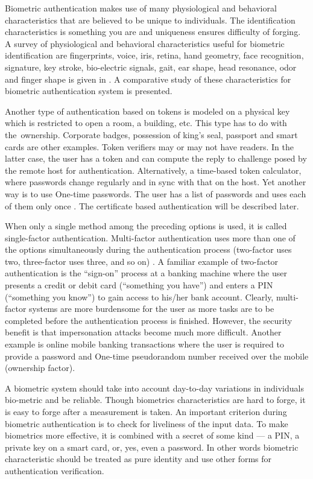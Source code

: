 \begin{multicols}{2}
Biometric authentication makes use of many physiological and behavioral characteristics that are believed to be unique to individuals. The identification characteristics is something you are and uniqueness ensures difficulty of forging. A survey of physiological and behavioral characteristics useful for biometric identification are fingerprints, voice, iris, retina, hand geometry, face recognition, signature, key stroke, bio-electric signals, gait, ear shape, head resonance, odor and finger shape is given in \cite{chap2-key3}. A comparative study of these characteristics for biometric authentication system is presented. 

Another type of authentication based on tokens is modeled on a physical key which is restricted to open a room, a building, etc. This type has to do with the ownership. Corporate badges, possession of king's seal, passport and smart cards are other examples. Token verifiers may or may not have readers. In the latter case, the user has a token and can compute the reply to challenge posed by the remote host for authentication. Alternatively, a time-based token calculator, where passwords change regularly and in sync with that on the host. Yet another way is to use One-time passwords. The user has a list of passwords and uses each of them only once \cite{chap2-key2}. The certificate based authentication will be described later.

When only a single method among the preceding options is used, it is called single-factor authentication. Multi-factor authentication uses more than one of the options simultaneously during the authentication process (two-factor uses two, three-factor uses three, and so on) \cite{chap2-key2}. A familiar example of two-factor authentication is the ``sign-on'' process at a banking machine where the user presents a credit or debit card (``something you have'') and enters a PIN (``something you know'') to gain access to his/her bank account. Clearly, multi-factor systems are more burdensome for the user as more tasks are to be completed before the authentication process is finished. However, the security benefit is that impersonation attacks become much more difficult. Another example is online mobile banking transactions where the user is required to provide a password and One-time pseudorandom number received over the mobile (ownership factor).

A biometric system should take into account day-to-day variations in individuals bio-metric and be reliable. Though biometrics characteristics are hard to forge, it is easy to forge after a measurement is taken. An important criterion during biometric authentication is to check for liveliness of the input data. To make biometrics more effective, it is combined with a secret of some kind --- a PIN, a private key on a smart card, or, yes, even a password. In other words biometric characteristic should be treated as pure identity and use other forms for authentication verification.


\end{multicols}
